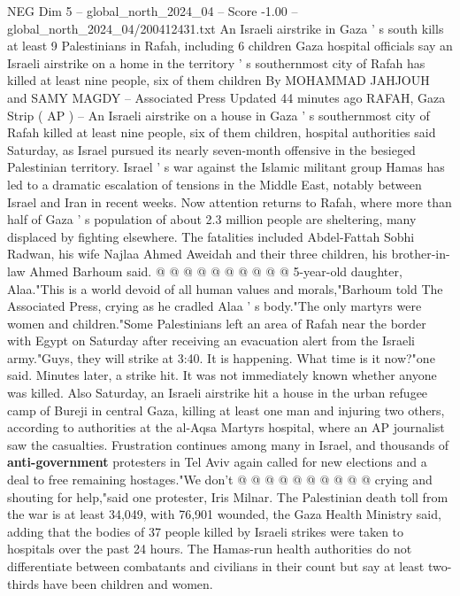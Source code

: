 \begin{textsample}{NEG Dim 5 – global\_north\_2024\_04 – Score -1.00 – global\_north\_2024\_04/200412431.txt}  \label{ex:f5_neg_165}
An Israeli airstrike in Gaza ' s south kills at least 9 Palestinians in Rafah, including 6 children Gaza hospital officials say an Israeli airstrike on a home in the territory ' s southernmost city of Rafah has killed at least nine people, six of them children By MOHAMMAD JAHJOUH and SAMY MAGDY -- Associated Press Updated 44 minutes ago RAFAH, Gaza Strip ( AP ) -- An Israeli airstrike on a house in Gaza ' s southernmost city of Rafah killed at least nine people, six of them children, hospital authorities said Saturday, as Israel pursued its nearly seven-month offensive in the besieged Palestinian territory.
Israel ' s war against the Islamic militant group Hamas has led to a dramatic escalation of tensions in the Middle East, notably between Israel and Iran in recent weeks.
Now attention returns to Rafah, where more than half of Gaza ' s population of about 2.3 million people are sheltering, many displaced by fighting elsewhere.
The fatalities included Abdel-Fattah Sobhi Radwan, his wife Najlaa Ahmed Aweidah and their three children, his brother-in-law Ahmed Barhoum said. @ @ @ @ @ @ @ @ @ @ 5-year-old daughter, Alaa."This is a world devoid of all human values and morals,"Barhoum told The Associated Press, crying as he cradled Alaa ' s body."The only martyrs were women and children."Some Palestinians left an area of Rafah near the border with Egypt on Saturday after receiving an evacuation alert from the Israeli army."Guys, they will strike at 3:40.
It is happening.
What time is it now?"one said.
Minutes later, a strike hit.
It was not immediately known whether anyone was killed.
Also Saturday, an Israeli airstrike hit a house in the urban refugee camp of Bureji in central Gaza, killing at least one man and injuring two others, according to authorities at the al-Aqsa Martyrs hospital, where an AP journalist saw the casualties.
Frustration continues among many in Israel, and thousands of \textbf{anti-government} protesters in Tel Aviv again called for new elections and a deal to free remaining hostages."We don't @ @ @ @ @ @ @ @ @ @ crying and shouting for help,"said one protester, Iris Milnar.
The Palestinian death toll from the war is at least 34,049, with 76,901 wounded, the Gaza Health Ministry said, adding that the bodies of 37 people killed by Israeli strikes were taken to hospitals over the past 24 hours.
The Hamas-run health authorities do not differentiate between combatants and civilians in their count but say at least two-thirds have been children and women.

\end{textsample}

